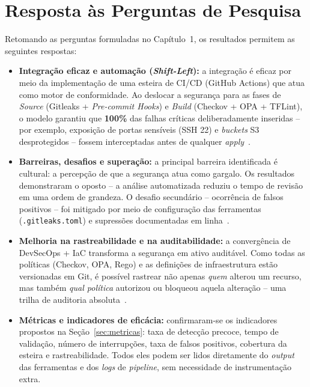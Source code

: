 \section{Resposta às Perguntas de Pesquisa}

Retomando as perguntas formuladas no Capítulo~1, os resultados permitem as seguintes respostas:

\begin{itemize}
    \item \textbf{Integração eficaz e automação (\textit{Shift-Left}):} a integração é eficaz por meio da implementação de uma esteira de CI/CD (GitHub Actions) que atua como motor de conformidade. Ao deslocar a segurança para as fases de \textit{Source} (Gitleaks + \textit{Pre-commit Hooks}) e \textit{Build} (Checkov + OPA + TFLint), o modelo garantiu que \textbf{100\%} das falhas críticas deliberadamente inseridas -- por exemplo, exposição de portas sensíveis (SSH 22) e \textit{buckets} S3 desprotegidos -- fossem interceptadas antes de qualquer \textit{apply}~.

    \item \textbf{Barreiras, desafios e superação:} a principal barreira identificada é cultural: a percepção de que a segurança atua como gargalo. Os resultados demonstraram o oposto -- a análise automatizada reduziu o tempo de revisão em uma ordem de grandeza. O desafio secundário -- ocorrência de falsos positivos -- foi mitigado por meio de configuração das ferramentas (\texttt{.gitleaks.toml}) e supressões documentadas em linha~.

    \item \textbf{Melhoria na rastreabilidade e na auditabilidade:} a convergência de DevSecOps + IaC transforma a segurança em ativo auditável. Como todas as políticas (Checkov, OPA, Rego) e as definições de infraestrutura estão versionadas em Git, é possível rastrear não apenas \textit{quem} alterou um recurso, mas também \textit{qual política} autorizou ou bloqueou aquela alteração -- uma trilha de auditoria absoluta~.

    \item \textbf{Métricas e indicadores de eficácia:} confirmaram-se os indicadores propostos na Seção~\ref{sec:metricas}: taxa de detecção precoce, tempo de validação, número de interrupções, taxa de falsos positivos, cobertura da esteira e rastreabilidade. Todos eles podem ser lidos diretamente do \textit{output} das ferramentas e dos \textit{logs} de \textit{pipeline}, sem necessidade de instrumentação extra.


\end{itemize}
